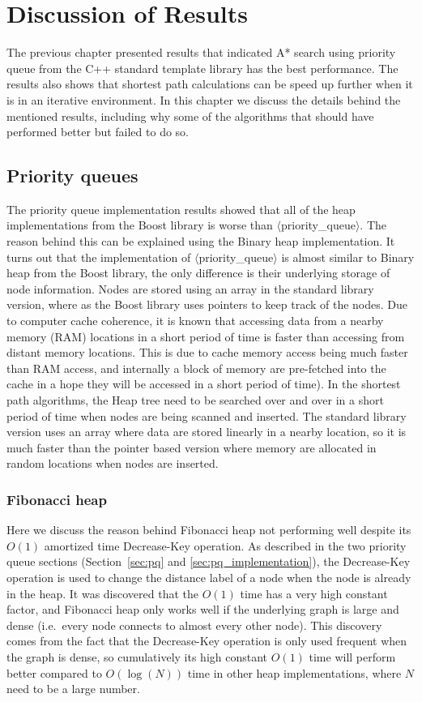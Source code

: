 \chapter{Discussion of Results}
The previous chapter presented results that indicated A* search using priority queue from the C++ standard template library has the best performance.
The results also shows that shortest path calculations can be speed up further when it is in an iterative environment.
In this chapter we discuss the details behind the mentioned results,
including why some of the algorithms that should have performed better but failed to do so.

\section{Priority queues}
The priority queue implementation results showed that
all of the heap implementations from the Boost library is worse than $\langle$priority\_queue$\rangle$.
The reason behind this can be explained using the Binary heap implementation.
It turns out that the implementation of $\langle$priority\_queue$\rangle$ is almost similar to Binary heap from the Boost library,
the only difference is their underlying storage of node information.
Nodes are stored using an array in the standard library version,
where as the Boost library uses pointers to keep track of 
the nodes.
Due to computer cache coherence,
it is known that accessing data from a nearby memory (RAM) locations in a short period of time is faster than accessing from distant memory locations.
This is due to cache memory access being much faster than RAM access,
and internally a block of memory are pre-fetched into the cache in a hope they will be accessed in a short period of time).
In the shortest path algorithms,
the Heap tree need to be searched over and over in a short period of time when nodes are being scanned and inserted.
The standard library version uses an array where data are stored linearly in a nearby location,
so it is much faster than the pointer based version where memory are allocated in random locations when nodes are inserted.

\subsection{Fibonacci heap}
Here we discuss the reason behind Fibonacci heap not performing well despite its $O(1)$ amortized time Decrease-Key operation.
As described in the two priority queue sections (Section~\ref{sec:pq} and \ref{sec:pq_implementation}),
the Decrease-Key operation is used to change the distance label of a node when the node is already in the heap.
It was discovered that the $O(1)$ time has a very high constant factor,
and Fibonacci heap only works well if the underlying graph is large and dense (i.e.\ every node connects to almost every other node).
This discovery comes from the fact that 
the Decrease-Key operation is only used frequent when the graph is dense,
so cumulatively its high constant $O(1)$ time will perform better compared to $O(\log(N))$ time in other heap implementations, where $N$ need to be a large number.

